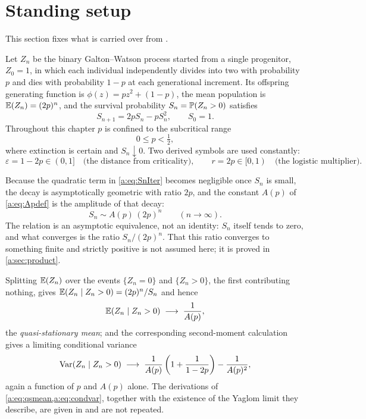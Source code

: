 \section{Standing setup}
\label{a:sec:setup}

This section fixes what is carried over from \ChM.

Let $Z_n$ be the binary Galton--Watson process started from a single progenitor,
$Z_0=1$, in which each individual independently divides into two with probability
$p$ and dies with probability $1-p$ at each generational increment. Its offspring
generating function is $\phi(z) = pz^2+(1-p)$, the mean population is
$\mathbb{E}\!\left(Z_n\right) = (2p)^n$, and the survival probability $S_n = \mathbb{P}\!\left(Z_n>0\right)$ satisfies
\begin{equation}
\label{a:eq:SnIter}
S_{n+1} = 2pS_n - pS_n^2,\qquad S_0 = 1 .
\end{equation}
Throughout this chapter $p$ is confined to the subcritical range
\begin{equation}
\label{a:eq:range}
0\le p<\tfrac12,
\end{equation}
where extinction is certain and $S_n\downarrow0$. Two derived symbols are used
constantly:
\begin{equation}
\label{a:eq:epsr}
\varepsilon = 1-2p\in(0,1] \quad\text{(the distance from criticality)},
\qquad
r = 2p\in[0,1) \quad\text{(the logistic multiplier)} .
\end{equation}

Because the quadratic term in \cref{a:eq:SnIter} becomes negligible once $S_n$ is
small, the decay is asymptotically geometric with ratio $2p$, and the constant
$A(p)$ of \cref{a:eq:Apdef} is the amplitude of that decay:
\begin{equation}
\label{a:eq:lateS}
S_n\sim A(p)\,(2p)^n\qquad(n\to\infty) .
\end{equation}
The relation is an asymptotic equivalence, not an identity: $S_n$ itself tends to
zero, and what converges is the ratio $S_n/(2p)^n$. That this ratio converges to
something finite and strictly positive is not assumed here; it is proved in
\cref{a:sec:product}.

Splitting
$\mathbb{E}\!\left(Z_n\right)$ over the events $\{Z_n=0\}$ and $\{Z_n>0\}$, the first contributing
nothing, gives $\mathbb{E}\!\left(Z_n\mid Z_n>0\right) = (2p)^n/S_n$ and hence
\begin{equation}
\label{a:eq:qsmean}
\mathbb{E}\!\left(Z_n\mid Z_n>0\right)\;\longrightarrow\;\frac{1}{A(p)},
\end{equation}
the \emph{quasi-stationary mean}; and the corresponding second-moment calculation
gives a limiting conditional variance
\begin{equation}
\label{a:eq:condvar}
\operatorname{Var}\!\left(Z_n\mid Z_n>0\right)\;\longrightarrow\;
\frac{1}{A(p)}\left(1+\frac{1}{1-2p}\right) - \frac{1}{A(p)^2} ,
\end{equation}
again a function of $p$ and $A(p)$ alone. The derivations of
\cref{a:eq:qsmean,a:eq:condvar}, together with the existence of the Yaglom limit
they describe, are given in \ChM{} and are not repeated.

